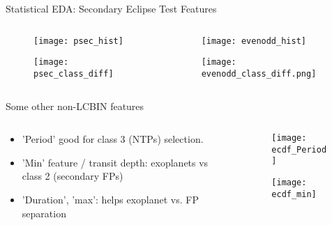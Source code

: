 \documentclass{beamer}
\begin{document}
\begin{frame}{Statistical EDA: Secondary Eclipse Test Features}
\begin{columns}
\begin{column}{0.5\textwidth}		
	\begin{figure}
	\texttt{[image: psec\_hist]}	
	\end{figure}

	\begin{figure}
	\texttt{[image: psec\_class\_diff]}			
	\end{figure}
\end{column}
\hspace{-20pt}
\vrule{}
\begin{column}{0.5\textwidth}
		\begin{figure}
		\texttt{[image: evenodd\_hist]}			
	\end{figure}
	\begin{figure}
	\texttt{[image: evenodd\_class\_diff.png]}			
\end{figure}
\end{column}

\end{columns}

\end{frame}

\begin{frame}{Some other non-LCBIN features}
	\begin{columns}
		\begin{column}{0.5\textwidth}
			\begin{itemize}
				\item 'Period' good for class 3 (NTPs) selection.
				\item 'Min' feature / transit depth: exoplanets vs class 2 (secondary FPs)
				\item 'Duration', 'max': helps exoplanet vs. FP separation
			\end{itemize}
		
		\end{column}
		\begin{column}{0.5\textwidth}
	\begin{figure}
		\texttt{[image: ecdf\_Period]}			
	\end{figure}
	\begin{figure}
	\texttt{[image: ecdf\_min]}			
\end{figure}
\end{column}
	\end{columns}
	
\end{frame}
\end{document}
